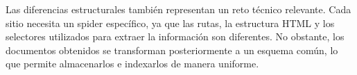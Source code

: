 Las diferencias estructurales también representan un reto técnico relevante. Cada sitio necesita un spider específico, ya que las rutas, la estructura HTML y los selectores utilizados para extraer la información son diferentes. No obstante, los documentos obtenidos se transforman posteriormente a un esquema común, lo que permite almacenarlos e indexarlos de manera uniforme.